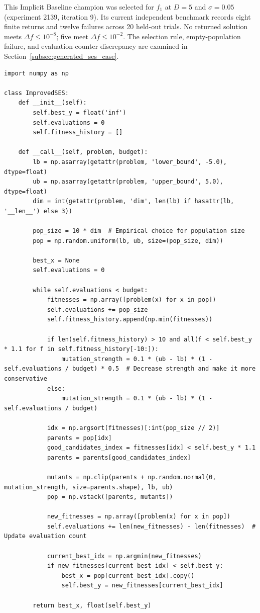 This Implicit Baseline champion was selected for $f_1$ at $D=5$ and
$\sigma=0.05$ (experiment 2139, iteration 9). Its current independent
benchmark records eight finite returns and twelve failures across
20 held-out trials. No returned solution meets $\Delta f\leq10^{-8}$;
five meet $\Delta f\leq10^{-2}$. The selection rule, empty-population
failure, and evaluation-counter discrepancy are examined in
Section~\ref{subsec:generated_ses_case}.

\begin{lstlisting}[style=championprogram,caption={Complete generated \texttt{ImprovedSES} champion used in the instance-dependent failure case study.},label={lst:generated_ses_complete}]
import numpy as np

class ImprovedSES:
    def __init__(self):
        self.best_y = float('inf')
        self.evaluations = 0
        self.fitness_history = []

    def __call__(self, problem, budget):
        lb = np.asarray(getattr(problem, 'lower_bound', -5.0), dtype=float)
        ub = np.asarray(getattr(problem, 'upper_bound', 5.0), dtype=float)
        dim = int(getattr(problem, 'dim', len(lb) if hasattr(lb, '__len__') else 3))

        pop_size = 10 * dim  # Empirical choice for population size
        pop = np.random.uniform(lb, ub, size=(pop_size, dim))

        best_x = None
        self.evaluations = 0

        while self.evaluations < budget:
            fitnesses = np.array([problem(x) for x in pop])
            self.evaluations += pop_size
            self.fitness_history.append(np.min(fitnesses))

            if len(self.fitness_history) > 10 and all(f < self.best_y * 1.1 for f in self.fitness_history[-10:]):
                mutation_strength = 0.1 * (ub - lb) * (1 - self.evaluations / budget) * 0.5  # Decrease strength and make it more conservative
            else:
                mutation_strength = 0.1 * (ub - lb) * (1 - self.evaluations / budget)

            idx = np.argsort(fitnesses)[:int(pop_size // 2)]
            parents = pop[idx]
            good_candidates_index = fitnesses[idx] < self.best_y * 1.1
            parents = parents[good_candidates_index]

            mutants = np.clip(parents + np.random.normal(0, mutation_strength, size=parents.shape), lb, ub)
            pop = np.vstack([parents, mutants])

            new_fitnesses = np.array([problem(x) for x in pop])
            self.evaluations += len(new_fitnesses) - len(fitnesses)  # Update evaluation count

            current_best_idx = np.argmin(new_fitnesses)
            if new_fitnesses[current_best_idx] < self.best_y:
                best_x = pop[current_best_idx].copy()
                self.best_y = new_fitnesses[current_best_idx]

        return best_x, float(self.best_y)
\end{lstlisting}


